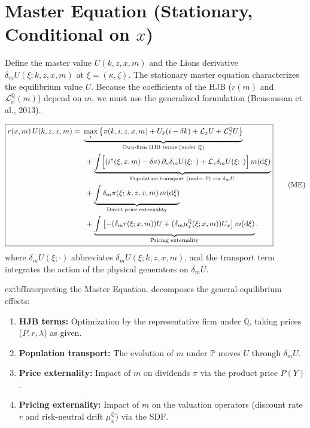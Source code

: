 \documentclass[11pt,letterpaper,oneside]{article}
\newcommand{\diff}{\mathrm{d}}
\newcommand{\Lz}{\mathcal{L}_z}
\newcommand{\LxQ}{\mathcal{L}_x^{\mathbb{Q}}}
\newcommand{\muxQ}{\mu_x^{\mathbb{Q}}}
\newcommand{\dmU}{\delta_m U}
\begin{document}
\section[Master Equation (Stationary, Conditional on x)]{Master Equation (Stationary, Conditional on $x$)}

Define the master value $U(k,z,x,m)$ and the Lions derivative $\dmU(\xi;k,z,x,m)$ at $\xi=(\kappa,\zeta)$. The stationary master equation characterizes the equilibrium value $U$. Because the coefficients of the HJB ($r(m)$ and $\LxQ(m)$) depend on $m$, we must use the generalized formulation (Bensoussan et al., 2013).

\begin{equation}
\boxed{
\begin{aligned}
r(x,m)\,U(k,z,x,m)=\ &\underbrace{\max_{i}\big\{\pi(k,i,z,x,m)+U_k(i-\delta k)+\Lz U+\LxQ U\big\}}_{\text{Own-firm HJB terms (under $\mathbb{Q}$)}}\\
&\ +\underbrace{\int\Bigl[(i^*(\xi,x,m)-\delta\kappa)\,\partial_\kappa\dmU(\xi;\cdot)
+\Lz \dmU(\xi;\cdot)\Bigr]\,m(\diff \xi)}_{\text{Population transport (under $\mathbb{P}$) via }\dmU}\\
&\ +\underbrace{\int \delta_m \pi(\xi;\,k,z,x,m)\, m(\diff \xi)}_{\text{Direct price externality}}\\
&\ +\underbrace{\int \left[ -(\delta_m r(\xi;x,m)) U + (\delta_m \muxQ(\xi;x,m)) U_x \right] m(\diff \xi)}_{\text{Pricing externality}}.
\end{aligned}}
\tag{ME}\label{eq:ME}
\end{equation}
where $\dmU(\xi;\cdot)$ abbreviates $\dmU(\xi;k,z,x,m)$, and the transport term integrates the action of the physical generators on $\dmU$.

\begin{tcolorbox}[didacticstyle]
      extbf{Interpreting the Master Equation.}  decomposes the general-equilibrium effects:
\begin{enumerate}[leftmargin=1.25em,label=(\roman*)]
  \item \textbf{HJB terms:} Optimization by the representative firm under $\mathbb{Q}$, taking prices ($P, r, \lambda$) as given.
  \item \textbf{Population transport:} The evolution of $m$ under $\mathbb{P}$ moves $U$ through $\dmU$.
  \item \textbf{Price externality:} Impact of $m$ on dividends $\pi$ via the product price $P(Y)$.
  \item \textbf{Pricing externality:} Impact of $m$ on the valuation operators (discount rate $r$ and risk-neutral drift $\muxQ$) via the SDF.
\end{enumerate}
\end{tcolorbox}
\end{document}
